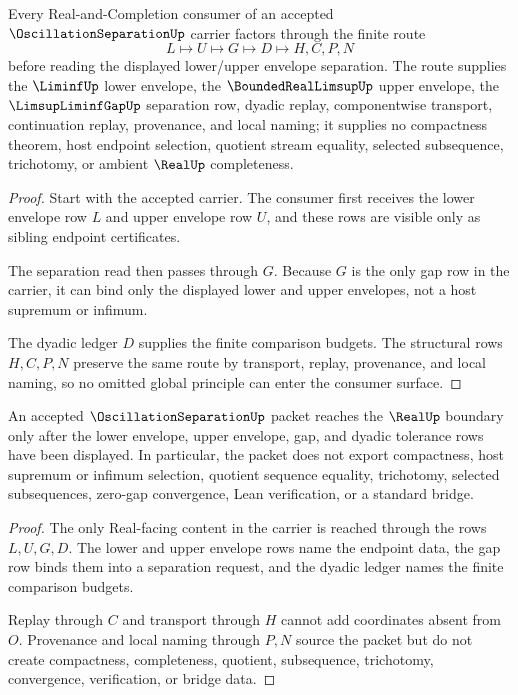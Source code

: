 \begin{theorem}
\label{thm:oscillation-separation-envelope-route}
Every Real-and-Completion consumer of an accepted $\OscillationSeparationUp$ carrier factors through the finite route
$$
L \longmapsto U \longmapsto G \longmapsto D \longmapsto H,C,P,N
$$
before reading the displayed lower/upper envelope separation. The route supplies the $\LiminfUp$ lower envelope, the $\BoundedRealLimsupUp$ upper envelope, the $\LimsupLiminfGapUp$ separation row, dyadic replay, componentwise transport, continuation replay, provenance, and local naming; it supplies no compactness theorem, host endpoint selection, quotient stream equality, selected subsequence, trichotomy, or ambient $\RealUp$ completeness.
\end{theorem}
\begin{proof}
Start with the accepted carrier. The consumer first receives the lower envelope row $L$ and upper envelope row $U$, and these rows are visible only as sibling endpoint certificates.

The separation read then passes through $G$. Because $G$ is the only gap row in the carrier, it can bind only the displayed lower and upper envelopes, not a host supremum or infimum.

The dyadic ledger $D$ supplies the finite comparison budgets. The structural rows $H,C,P,N$ preserve the same route by transport, replay, provenance, and local naming, so no omitted global principle can enter the consumer surface.
\end{proof}

\begin{theorem}
\label{thm:oscillation-separation-real-boundary-nonescape}
An accepted $\OscillationSeparationUp$ packet reaches the $\RealUp$ boundary only after the lower envelope, upper envelope, gap, and dyadic tolerance rows have been displayed. In particular, the packet does not export compactness, host supremum or infimum selection, quotient sequence equality, trichotomy, selected subsequences, zero-gap convergence, Lean verification, or a standard bridge.
\end{theorem}
\begin{proof}
The only Real-facing content in the carrier is reached through the rows $L,U,G,D$. The lower and upper envelope rows name the endpoint data, the gap row binds them into a separation request, and the dyadic ledger names the finite comparison budgets.

Replay through $C$ and transport through $H$ cannot add coordinates absent from $O$. Provenance and local naming through $P,N$ source the packet but do not create compactness, completeness, quotient, subsequence, trichotomy, convergence, verification, or bridge data.
\end{proof}

